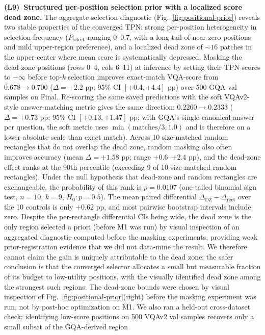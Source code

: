 \documentclass{article}
\begin{document}
\textbf{(L9)~Structured per-position selection prior with a localized score
dead zone.}
The aggregate selection diagnostic (Fig.~\ref{fig:positional-prior}) reveals
two stable properties of the converged TPN: strong per-position heterogeneity
in selection frequency ($P_\text{select}$ ranging 0--0.7, with a long tail of
near-zero positions and mild upper-region preference), and a
localized dead zone of $\sim\!16$ patches in the upper-center where mean
score is systematically depressed. Masking the dead-zone positions
(rows 0--4, cols 6--11) at inference by setting their TPN scores to
$-\infty$ before top-$k$ selection improves exact-match VQA-score from
$0.678 \to 0.700$ ($\Delta{=}{+}2.2$ pp; 95\% CI $[{+0.4},{+4.4}]$ pp)
over 500 GQA val samples on Final. Re-scoring the same saved predictions with
the soft VQAv2-style answer-matching metric gives the same direction:
$0.2260 \to 0.2333$ ($\Delta{=}{+}0.73$ pp; 95\% CI
$[{+0.13},{+1.47}]$ pp; with GQA's single canonical answer per question,
the soft metric uses $\min(\text{matches}/3,1.0)$ and is therefore on a
lower absolute scale than exact match). Across 10 size-matched random rectangles
that do not overlap the dead zone, random masking also often improves
accuracy (mean $\Delta{=}{+}1.58$ pp; range $+0.6$--$+2.4$ pp), and the
dead-zone effect ranks at the 90th percentile (exceeding 9 of 10 size-matched
random rectangles). Under the null hypothesis that dead-zone and random
rectangles are exchangeable, the probability of this rank is $p=0.0107$
(one-tailed binomial sign test, $n{=}10$, $k{=}9$, $H_0\!:\!p{=}0.5$).
The mean paired differential
$\Delta_\text{DZ}-\Delta_\text{rect}$ over the 10 controls is only
$+0.62$ pp, and most pairwise bootstrap intervals include zero. Despite
the per-rectangle differential CIs being wide, the dead zone is the only
region selected a priori (before M1 was run) by visual inspection of an
aggregated diagnostic computed before the masking experiments, providing weak
prior-registration evidence that we did not data-mine the result. We therefore
cannot claim the gain is uniquely attributable to the dead zone; the safer conclusion is
that the converged selector allocates a small but measurable fraction of its
budget to low-utility positions, with the visually identified dead zone among
the strongest such regions. The dead-zone bounds were chosen by visual
inspection of Fig.~\ref{fig:positional-prior}(right) before the masking
experiment was run, not by post-hoc optimization on M1.
We also ran a held-out cross-dataset check: identifying low-score positions on
500 VQAv2 val samples recovers only a small subset of the GQA-derived region
\end{document}
